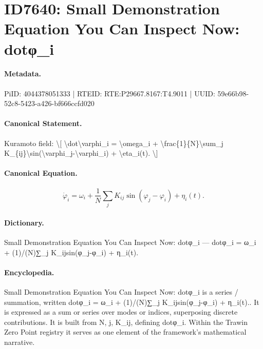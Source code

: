 \section*{ID7640: Small Demonstration Equation You Can Inspect Now: dotφ\_i}
\paragraph{Metadata.}
PiID: 4044378051333 | RTEID: RTE:P29667.8167:T4.9011 | UUID: 59e66b98-52c8-5423-a426-bf666ccfd020

\paragraph{Canonical Statement.}
Kuramoto field: \textbackslash{}[ \textbackslash{}dot\textbackslash{}varphi\_i = \textbackslash{}omega\_i + \textbackslash{}frac\{1\}\{N\}\textbackslash{}sum\_j K\_\{ij\}\textbackslash{}sin(\textbackslash{}varphi\_j-\textbackslash{}varphi\_i) + \textbackslash{}eta\_i(t). \textbackslash{}]

\paragraph{Canonical Equation.}
\[
\dot\varphi_i = \omega_i + \frac{1}{N}\sum_j K_{ij}\sin(\varphi_j-\varphi_i) + \eta_i(t).
\]

\paragraph{Dictionary.}
Small Demonstration Equation You Can Inspect Now: dotφ\_i — dotφ\_i = ω\_i + (1)/(N)∑\_j K\_ijsin(φ\_j-φ\_i) + η\_i(t).

\paragraph{Encyclopedia.}
Small Demonstration Equation You Can Inspect Now: dotφ\_i is a series / summation, written dotφ\_i = ω\_i + (1)/(N)∑\_j K\_ijsin(φ\_j-φ\_i) + η\_i(t).. It is expressed as a sum or series over modes or indices, superposing discrete contributions. It is built from N, j, K\_ij, defining dotφ\_i. Within the Trawin Zero Point registry it serves as one element of the framework's mathematical narrative.
